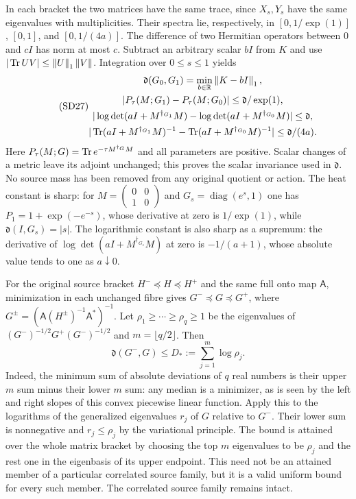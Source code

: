 \documentclass[11pt]{article}
\begin{document}
In each bracket the two matrices have the same trace, since $X_s,Y_s$
have the same eigenvalues with multiplicities. Their spectra lie,
respectively, in $[0,1/\exp(1)]$, $[0,1]$, and $[0,1/(4a)]$.
The difference of two Hermitian operators between $0$ and $cI$ has
norm at most $c$. Subtract an arbitrary scalar $bI$ from $K$ and use
$|\operatorname{Tr} UV|\le\left\lVert U\right\rVert_1\left\lVert V\right\rVert$. Integration over $0\le s\le1$ yields
\begin{equation}\tag{SD27}
\begin{gathered}
\mathfrak d(G_0,G_1)=\min_{b\in\mathbb R}\left\lVert K-bI\right\rVert_1,\\
|P_\tau(M;G_1)-P_\tau(M;G_0)|\le\mathfrak d/\exp(1),\\
|\log\det(aI+M^{\dagger_{G_1}}M)
-\log\det(aI+M^{\dagger_{G_0}}M)|\le\mathfrak d,\\
|\operatorname{Tr}(aI+M^{\dagger_{G_1}}M)^{-1}
-\operatorname{Tr}(aI+M^{\dagger_{G_0}}M)^{-1}|\le\mathfrak d/(4a).
\end{gathered}
\end{equation}
Here $P_\tau(M;G)=\operatorname{Tr} e^{-\tau M^{\dagger_G}M}$ and all parameters
are positive. Scalar changes of a metric leave its adjoint unchanged;
this proves the scalar invariance used in $\mathfrak d$. No source
mass has been removed from any original quotient or action.
The heat constant is sharp: for
$M=\left(\begin{smallmatrix}0&0\\1&0\end{smallmatrix}\right)$ and
$G_s=\operatorname{diag}(e^s,1)$ one has
$P_1=1+\exp(-e^{-s})$, whose derivative at zero is $1/\exp(1)$,
while $\mathfrak d(I,G_s)=|s|$.
The logarithmic constant is also sharp as a supremum: the derivative
of $\log\det(aI+M^{\dagger_{G_s}}M)$ at zero is $-1/(a+1)$,
whose absolute value tends to one as $a\downarrow0$.

For the original source bracket $H^-\preceq H\preceq H^+$ and the
same full onto map $\mathsf A$, minimization in each unchanged fibre
gives $G^-\preceq G\preceq G^+$, where
$G^\pm=(\mathsf A(H^\pm)^{-1}\mathsf A^*)^{-1}$. Let
$\rho_1\ge\cdots\ge\rho_q\ge1$ be the eigenvalues of
$(G^-)^{-1/2}G^+(G^-)^{-1/2}$ and $m=\lfloor q/2\rfloor$. Then
\begin{equation}\tag{SD28}
\boxed{\mathfrak d(G^-,G)\le D_*:=\sum_{j=1}^m\log\rho_j.}
\end{equation}
Indeed, the minimum sum of absolute deviations of $q$ real numbers
is their upper $m$ sum minus their lower $m$ sum: any median is a
minimizer, as is seen by the left and right slopes of this convex
piecewise linear function. Apply this to the logarithms of the
generalized eigenvalues $r_j$ of $G$ relative to $G^-$. Their lower
sum is nonnegative and $r_j\le\rho_j$ by the variational principle.
The bound is attained over the whole matrix bracket by choosing the
top $m$ eigenvalues to be $\rho_j$ and the rest one in the eigenbasis
of its upper endpoint. This need not be an attained member of a
particular correlated source family, but it is a valid uniform bound
for every such member. The correlated source family remains intact.
\end{document}
